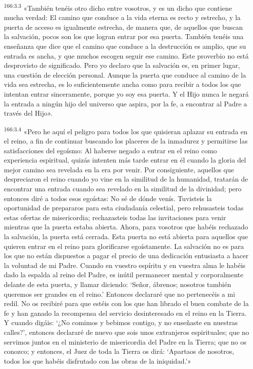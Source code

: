 \par 
\textsuperscript{166:3.3} «También tenéis otro dicho entre vosotros, y es un dicho que contiene mucha verdad: El camino que conduce a la vida eterna es recto y estrecho, y la puerta de acceso es igualmente estrecha, de manera que, de aquellos que buscan la salvación, pocos son los que logran entrar por esa puerta. También tenéis una enseñanza que dice que el camino que conduce a la destrucción es amplio, que su entrada es ancha, y que muchos escogen seguir ese camino. Este proverbio no está desprovisto de significado. Pero yo declaro que la salvación es, en primer lugar, una cuestión de elección personal. Aunque la puerta que conduce al camino de la vida sea estrecha, es lo suficientemente ancha como para recibir a todos los que intentan entrar sinceramente, porque yo soy esa puerta. Y el Hijo nunca le negará la entrada a ningún hijo del universo que aspira, por la fe, a encontrar al Padre a través del Hijo».

\par 
\textsuperscript{166:3.4} «Pero he aquí el peligro para todos los que quisieran aplazar su entrada en el reino, a fin de continuar buscando los placeres de la inmadurez y permitirse las satisfacciones del egoísmo: Al haberse negado a entrar en el reino como experiencia espiritual, quizás intenten más tarde entrar en él cuando la gloria del mejor camino sea revelada en la era por venir. Por consiguiente, aquellos que despreciaron el reino cuando yo vine en la similitud de la humanidad, tratarán de encontrar una entrada cuando sea revelado en la similitud de la divinidad; pero entonces diré a todos esos egoístas: No sé de dónde venís. Tuvisteis la oportunidad de prepararos para esta ciudadanía celestial, pero rehusasteis todas estas ofertas de misericordia; rechazasteis todas las invitaciones para venir mientras que la puerta estaba abierta. Ahora, para vosotros que habéis rechazado la salvación, la puerta está cerrada. Esta puerta no está abierta para aquellos que quieren entrar en el reino para glorificarse egoístamente. La salvación no es para los que no están dispuestos a pagar el precio de una dedicación entusiasta a hacer la voluntad de mi Padre. Cuando en vuestro espíritu y en vuestra alma le habéis dado la espalda al reino del Padre, es inútil permanecer mental y corporalmente delante de esta puerta, y llamar diciendo: `Señor, ábrenos; nosotros también queremos ser grandes en el reino.' Entonces declararé que no pertenecéis a mi redil. No os recibiré para que estéis con los que han librado el buen combate de la fe y han ganado la recompensa del servicio desinteresado en el reino en la Tierra. Y cuando digáis: `¿No comimos y bebimos contigo, y no enseñaste en nuestras calles?', entonces declararé de nuevo que sois unos extranjeros espirituales; que no servimos juntos en el ministerio de misericordia del Padre en la Tierra; que no os conozco; y entonces, el Juez de toda la Tierra os dirá: `Apartaos de nosotros, todos los que habéis disfrutado con las obras de la iniquidad.'»

